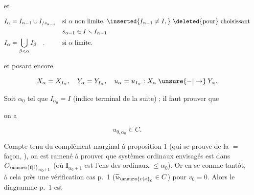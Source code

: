 et

\[
\begin{aligned}
 I_\alpha&=I_{\alpha-1}\cup I_{/s_{\alpha-1}}
 &&\text{si }\alpha\text{ non limite, }\inserted{I_{\alpha-1}\ne I,}\ \deleted{\text{pour}}\ \text{choisissant}\\
 &&&s_{\alpha-1}\in I\smallsetminus I_{\alpha-1}\\
 I_\alpha&=\bigcup_{\beta<\alpha} I_\beta\quad .
 &&\text{si }\alpha\text{ limite.}
\end{aligned}
\]

et posant encore

\[
 X_\alpha=X_{I_\alpha},\quad Y_\alpha=Y_{I_\alpha},\quad u_\alpha=u_{I_\alpha}:X_\alpha\mathbin{\unsure{-|\to}}Y_\alpha.
\]

Soit $\alpha_0$ tel que \deleted{$\unsure{\alpha}$} $I_{\alpha_0}=I$ (indice terminal de la suite) ;  il faut prouver que 



on a

\[
 u_{0,\alpha_0}\in C.
\]

Compte tenu du complément marginal à proposition 1 (qui se prouve de la $=$ façon, \unsure{\ldots}), on est ramené à prouver que   systèmes ordinaux envisagés est dans $C_{\unsure{\mathbf I|\mathbb I}_{\alpha_0+1}}$  (où $\mathbf I_{\alpha_0+1}$ est l’ens des ordinaux $\leq\alpha_0$). Or  en  se   comme tantôt, à cela près    une vérification  cas p.~1 ($\widetilde u_{\unsure{v|\nu}_0}\in C$) pour $v_0=0$. Alors le diagramme  p.~1 est


